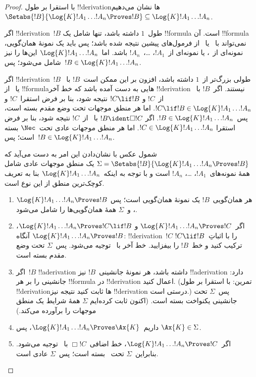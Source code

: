 \documentclass[../../../include/open-logic-section]{subfiles}
\begin{document}
\begin{proof}
  با استقرا بر طول !!{derivation}ها نشان می‌دهیم
  $\Setabs{!B}{\Log{K} !A_1 \dots !A_n \Proves !B} \subseteq
  \Log{K} !A_1 \dots !A_n$.

  اگر !!{derivation}~$!B$ طول~$1$ داشته باشد، تنها شامل یک
  !!{formula} است. آن !!{formula} نمی‌تواند با~\MP{} یا~\Nec{} از
  فرمول‌های پیشین نتیجه شده باشد؛ پس باید یک نمونهٔ همان‌گویی، نمونه‌ای
  از~، یا نمونه‌ای از~$!A_1$،
  \dots،~$!A_n$ باشد. اما~$\Log{K}!A_1\dots!A_n$ این‌ها را نیز شامل
  می‌شود؛ پس~$!B \in \Log{K}!A_1 \dots !A_n$.

  اگر !!{derivation}~$!B$ طولی بزرگ‌تر از~$1$ داشته باشد، افزون بر این
  ممکن است~$!B$ با~\MP{} یا~\Nec{} از !!{formula}هایی به دست آمده باشد
  که خط آخر !!{derivation} نیستند. اگر~$!B$ با~\MP{} از~$!C$ و
  $!C \lif !B$ نتیجه شود، بنا بر فرض استقرا~$!C$ و
  $!C \lif !B \in \Log{K}!A_1 \dots !A_n$. اما هر منطق موجهات تحت وضع
  مقدم بسته است، پس~$!B \in \Log{K}!A_1 \dots !A_n$. اگر
  $!B \ident \Box !C$ با~\Nec{} از~$!C$ نتیجه شود، بنا بر فرض استقرا
  $!C \in \Log{K}!A_1 \dots !A_n$. اما هر منطق موجهات عادی تحت~$\Nec$
  بسته است؛ پس~$!B \in \Log{K}!A_1\dots!A_n$.

  شمول عکس با نشان‌دادن این امر به دست می‌آید که
  $\Sigma = \Setabs{!B}{\Log{K} !A_1 \dots !A_n \Proves !B }$ یک منطق
  موجهات عادی شامل همهٔ نمونه‌های~$!A_1$، \dots، $!A_n$ است و با توجه
  به اینکه~$\Log{K} !A_1 \dots !A_n$ بنا به تعریف کوچک‌ترین منطق از
  این نوع است.
  \begin{enumerate}
    \item هر همان‌گویی~$!B$ یک نمونهٔ همان‌گویی است؛ پس
      $\Log{K}!A_1\dots!A_n \Proves !B$، و~$\Sigma$ همهٔ همان‌گویی‌ها
      را شامل می‌شود.
    \item اگر~$\Log{K}!A_1\dots!A_n \Proves !C$ و
      $\Log{K}!A_1\dots!A_n \Proves !C \lif !B$، آنگاه
      $\Log{K}!A_1\dots!A_n \Proves !B$: !!{derivation}~$!C$ را با
      اثباتِ~$!C \lif !B$ ترکیب کنید و خط~$!B$ را بیفزایید.
      خط آخر با~\MP{} توجیه می‌شود. پس~$\Sigma$ تحت وضع مقدم بسته است.
    \item اگر~$!B$ !!a{derivation} داشته باشد، هر نمونهٔ جانشینی~$!B$
      نیز !!a{derivation} دارد: جانشینی را بر هر !!{formula} در
      !!{derivation} اعمال کنید. (تمرین: با استقرا بر طول
      !!{derivation}ها ثابت کنید نتیجه نیز !!{derivation} درستی است.)
      پس~$\Sigma$ تحت جانشینی یکنواخت بسته است. (اکنون ثابت کرده‌ایم
      $\Sigma$ همهٔ شرایط یک منطق موجهات را برآورده می‌کند.)
    \item داریم~$\Log{K}!A_1\dots!A_n \Proves \Ax{K}$، پس
      $\Ax{K} \in \Sigma$.
    \item اگر~$\Log{K}!A_1\dots!A_n \Proves !C$، خط اضافی~$\Box !C$
      با~\Nec{} توجیه می‌شود. بنابراین~$\Sigma$ تحت~\Nec{} بسته است؛
      پس~$\Sigma$ عادی است.
  \end{enumerate}
\end{proof}
\end{document}
